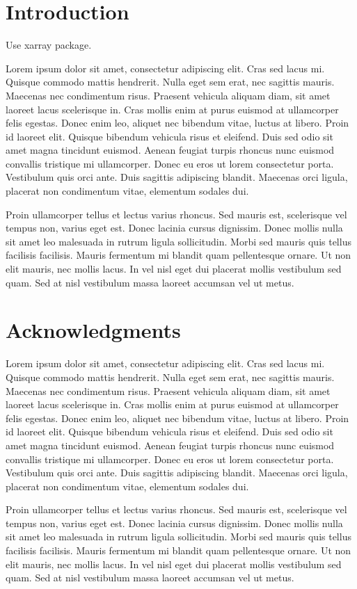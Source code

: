 \documentclass[12pt]{article}
\begin{document}
\pagestyle{myheadings}

\section{Introduction}
Use xarray package.\cite{hoyer2017xarray}

Lorem ipsum dolor sit amet, consectetur adipiscing elit. Cras sed lacus mi. Quisque commodo mattis hendrerit. Nulla eget sem erat, nec sagittis mauris. Maecenas nec condimentum risus. Praesent vehicula aliquam diam, sit amet laoreet lacus scelerisque in. Cras mollis enim at purus euismod at ullamcorper felis egestas. Donec enim leo, aliquet nec bibendum vitae, luctus at libero. Proin id laoreet elit. Quisque bibendum vehicula risus et eleifend. Duis sed odio sit amet magna tincidunt euismod. Aenean feugiat turpis rhoncus nunc euismod convallis tristique mi ullamcorper. Donec eu eros ut lorem consectetur porta. Vestibulum quis orci ante. Duis sagittis adipiscing blandit. Maecenas orci ligula, placerat non condimentum vitae, elementum sodales dui.

Proin ullamcorper tellus et lectus varius rhoncus. Sed mauris est, scelerisque vel tempus non, varius eget est. Donec lacinia cursus dignissim. Donec mollis nulla sit amet leo malesuada in rutrum ligula sollicitudin. Morbi sed mauris quis tellus facilisis facilisis. Mauris fermentum mi blandit quam pellentesque ornare. Ut non elit mauris, nec mollis lacus. In vel nisl eget dui placerat mollis vestibulum sed quam. Sed at nisl vestibulum massa laoreet accumsan vel ut metus.

\section{Acknowledgments}
Lorem ipsum dolor sit amet, consectetur adipiscing elit. Cras sed lacus mi. Quisque commodo mattis hendrerit. Nulla eget sem erat, nec sagittis mauris. Maecenas nec condimentum risus. Praesent vehicula aliquam diam, sit amet laoreet lacus scelerisque in. Cras mollis enim at purus euismod at ullamcorper felis egestas. Donec enim leo, aliquet nec bibendum vitae, luctus at libero. Proin id laoreet elit. Quisque bibendum vehicula risus et eleifend. Duis sed odio sit amet magna tincidunt euismod. Aenean feugiat turpis rhoncus nunc euismod convallis tristique mi ullamcorper. Donec eu eros ut lorem consectetur porta. Vestibulum quis orci ante. Duis sagittis adipiscing blandit. Maecenas orci ligula, placerat non condimentum vitae, elementum sodales dui.

Proin ullamcorper tellus et lectus varius rhoncus. Sed mauris est, scelerisque vel tempus non, varius eget est. Donec lacinia cursus dignissim. Donec mollis nulla sit amet leo malesuada in rutrum ligula sollicitudin. Morbi sed mauris quis tellus facilisis facilisis. Mauris fermentum mi blandit quam pellentesque ornare. Ut non elit mauris, nec mollis lacus. In vel nisl eget dui placerat mollis vestibulum sed quam. Sed at nisl vestibulum massa laoreet accumsan vel ut metus.

{}

\end{document}
